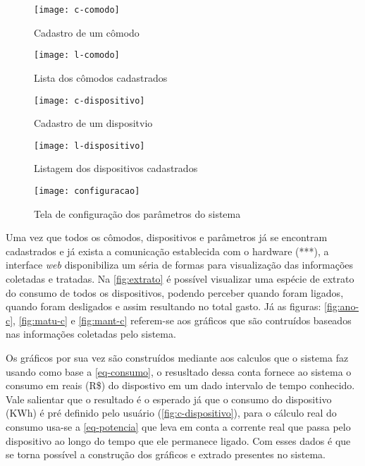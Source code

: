 \begin{figure}[h!]
	\texttt{[image: c-comodo]}
	\centering
	\caption[Cadastro de um cômodo]{Cadastro de um cômodo}
	\label{fig:c-comodo}
\end{figure}
\FloatBarrier

\begin{figure}[h!]
	\texttt{[image: l-comodo]}
	\centering
	\caption[Lista dos cômodos cadastrados]{Lista dos cômodos cadastrados}
	\label{fig:l-comodo}
\end{figure}
\FloatBarrier

\begin{figure}[h!]
	\texttt{[image: c-dispositivo]}
	\centering
	\caption[Cadastro de um dispositivo]{Cadastro de um dispositvio}
	\label{fig:c-dispositivo} 
\end{figure}
\FloatBarrier

\begin{figure}[h!]
	\texttt{[image: l-dispositivo]}
	\centering
	\caption[Listagem dos dispositivos cadastrados]{Listagem dos dispositivos cadastrados}
	\label{fig:l-dispositivo} 
\end{figure}
\FloatBarrier

\begin{figure}[h!]
	\texttt{[image: configuracao]}
	\centering
	\caption[Tela de configuração dos parâmetros do sistema]{Tela de configuração dos parâmetros do sistema}
	\label{fig:configuracao-ft} 
\end{figure}
\FloatBarrier

Uma vez que todos os cômodos, dispositivos e parâmetros já se encontram cadastrados e já exista a comunicação establecida com o hardware (***), a interface
\textit{web} disponibiliza um séria de formas para visualização das informações coletadas e tratadas. Na \autoref{fig:extrato} é possível visualizar
uma espécie de extrato do consumo de todos os dispositivos, podendo perceber quando foram ligados, quando foram desligados e assim resultando no total gasto.
Já as figuras: \ref{fig:ano-c}, \ref{fig:matu-c} e \ref{fig:mant-c} referem-se aos gráficos que são contruídos baseados nas informações coletadas pelo sistema.

Os gráficos por sua vez são construídos mediante aos calculos que o sistema faz usando como base a \autoref{eq-consumo}, o resusltado dessa conta
fornece ao sistema o consumo em reais (R\$) do dispostivo em um dado intervalo de tempo conhecido. Vale salientar que o resultado é o esperado já que o consumo
do dispositivo (KWh) é pré definido pelo usuário (\autoref{fig:c-dispositivo}), para o cálculo real do consumo usa-se a \autoref{eq-potencia} que leva em conta a corrente real que passa
pelo dispositivo ao longo do tempo que ele permanece ligado. Com esses dados é que se torna possível a construção dos gráficos e extrado presentes no sistema.


